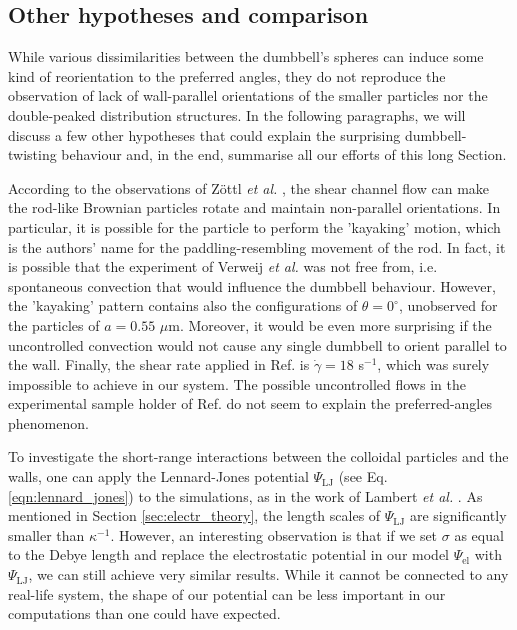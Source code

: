 \documentclass{master_thesis}
\begin{document}
\subsection{Other hypotheses and comparison} \label{sec:other_hypotheses}

While various dissimilarities between the dumbbell's spheres can induce some kind of reorientation to the preferred angles, they do not reproduce the observation of lack of wall-parallel orientations of the smaller particles nor the double-peaked distribution structures. In the following paragraphs, we will discuss a few other hypotheses that could explain the surprising dumbbell-twisting behaviour and, in the end, summarise all our efforts of this long Section.

According to the observations of Zöttl \textit{et al.} \cite{zottl_2019}, the shear channel flow can make the rod-like Brownian particles rotate and maintain non-parallel orientations. In particular, it is possible for the particle to perform the 'kayaking' motion, which is the authors' name for the paddling-resembling movement of the rod. In fact, it is possible that the experiment of Verweij \textit{et al.} \cite{verweij2021} was not free from, i.e. spontaneous convection that would influence the dumbbell behaviour. However, the 'kayaking' pattern contains also the configurations of $\theta=0^{\circ}$, unobserved for the particles of $a=0.55$ $\mu$m. Moreover, it would be even more surprising if the uncontrolled convection would not cause any single dumbbell to orient parallel to the wall. Finally, the shear rate applied in Ref. \cite{zottl_2019} is $\dot{\gamma}=18$ s$^{-1}$, which was surely impossible to achieve in our system. The possible uncontrolled flows in the experimental sample holder of Ref. \cite{verweij2021} do not seem to explain the preferred-angles phenomenon.

To investigate the short-range interactions between the colloidal particles and the walls, one can apply the Lennard-Jones potential $\Psi_{\textrm{LJ}}$ (see Eq. \eqref{eqn:lennard_jones}) to the simulations, as in the work of Lambert \textit{et al.} \cite{lambert_2024}. As mentioned in Section \ref{sec:electr_theory}, the length scales of $\Psi_{\textrm{LJ}}$ are significantly smaller than $\kappa^{-1}$. However, an interesting observation is that if we set $\sigma$ as equal to the Debye length and replace the electrostatic potential in our model $\Psi_{\textrm{el}}$ with $\Psi_{\textrm{LJ}}$, we can still achieve very similar results. While it cannot be connected to any real-life system, the shape of our potential can be less important in our computations than one could have expected.
\end{document}
